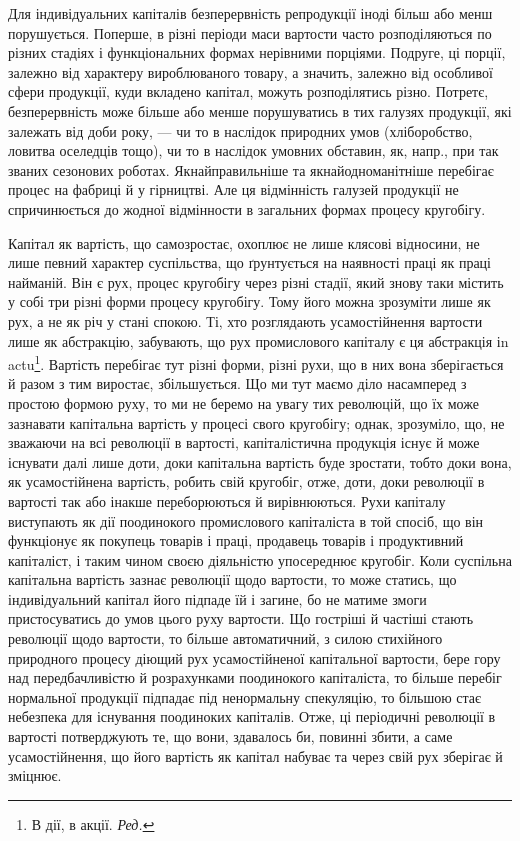 
Для індивідуальних капіталів безперервність репродукції іноді більш
або менш порушується. Поперше, в різні періоди маси вартости часто
розподіляються по різних стадіях і функціональних формах нерівними
порціями. Подруге, ці порції, залежно від характеру вироблюваного товару,
а значить, залежно від особливої сфери продукції, куди вкладено капітал,
можуть розподілятись різно. Потретє, безперервність може більше або
менше порушуватись в тих галузях продукції, які залежать від доби
року, — чи то в наслідок природних умов (хліборобство, ловитва оселедців
тощо), чи то в наслідок умовних обставин, як, напр., при так званих сезонових
роботах. Якнайправильніше та якнайодноманітніше перебігає процес
на фабриці й у гірництві. Але ця відмінність галузей продукції не спричинюється
до жодної відмінности в загальних формах процесу кругобігу.

Капітал як вартість, що самозростає, охоплює не лише клясові
відносини, не лише певний характер суспільства, що ґрунтується на наявності
праці як праці найманій. Він є рух, процес кругобігу через різні
стадії, який знову таки містить у собі три різні форми процесу кругобігу.
Тому його можна зрозуміти лише як рух, а не як річ у стані спокою.
Ті, хто розглядають усамостійнення вартости лише як абстракцію, забувають,
що рух промислового капіталу є ця абстракція іn actu\footnote*{
В дії, в акції. \emph{Ред.}
}. Вартість
перебігає тут різні форми, різні рухи, що в них вона зберігається й разом
з тим виростає, збільшується. Що ми тут маємо діло насамперед з простою
формою руху, то ми не беремо на увагу тих революцій, що їх
може зазнавати капітальна вартість у процесі свого кругобігу; однак,
зрозуміло, що, не зважаючи на всі революції в вартості, капіталістична
продукція існує й може існувати далі лише доти, доки капітальна вартість
буде зростати, тобто доки вона, як усамостійнена вартість, робить
свій кругобіг, отже, доти, доки революції в вартості так або інакше
переборюються й вирівнюються. Рухи капіталу виступають як дії поодинокого
промислового капіталіста в той спосіб, що він функціонує як
покупець товарів і праці, продавець товарів і продуктивний капіталіст,
і таким чином своєю діяльністю упосереднює кругобіг. Коли суспільна
капітальна вартість зазнає революції щодо вартости, то може статись, що
індивідуальний капітал його підпаде їй і загине, бо не матиме змоги пристосуватись
до умов цього руху вартости. Що гостріші й частіші стають
революції щодо вартости, то більше автоматичний, з силою стихійного
природного процесу діющий рух усамостійненої капітальної вартости,
бере гору над передбачливістю й розрахунками поодинокого капіталіста,
то більше перебіг нормальної продукції підпадає під ненормальну спекуляцію,
то більшою стає небезпека для існування поодиноких капіталів.
Отже, ці періодичні революції в вартості потверджують те, що вони,
здавалось би, повинні збити, а саме усамостійнення, що його вартість
як капітал набуває та через свій рух зберігає й зміцнює.

